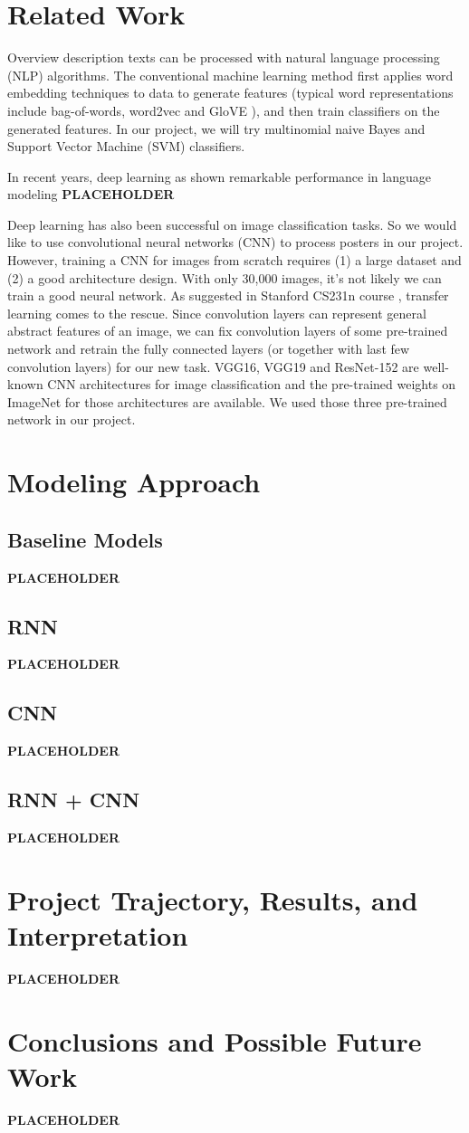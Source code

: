 \documentclass[12pt]{article} %
\newcommand{\plh}{\textbf{\color{red} PLACEHOLDER }}
\begin{document}
\section{Related Work}

Overview description texts can be processed with natural language processing (NLP) algorithms. The conventional machine learning method first applies word embedding techniques to data to generate features (typical word representations include bag-of-words, word2vec \cite{word2vec} and GloVE \cite{glove}), and then train classifiers on the generated features. In our project, we will try multinomial naive Bayes and Support Vector Machine (SVM) classifiers.

In recent years, deep learning as shown remarkable  performance in language modeling \plh

Deep learning has also been successful on image classification tasks. So we would like to use convolutional neural networks (CNN) to process posters in our project. However, training a CNN for images from scratch requires (1) a large dataset and (2) a good architecture design. With only 30,000 images, it's not likely we can train a good neural network. As suggested in Stanford CS231n course \cite{transferl}, transfer learning comes to the rescue. Since convolution layers can represent general abstract features of an image, we can fix convolution layers of some pre-trained network and retrain the fully connected layers (or together with last few convolution layers) for our new task. VGG16, VGG19 \cite{vgg} and ResNet-152 \cite{resnet} are well-known CNN architectures for image classification and the pre-trained weights on ImageNet for those architectures are available. We used those three pre-trained network in our project.


\section{Modeling Approach}

\subsection{Baseline Models}
\plh
\subsection{RNN}
\plh
\subsection{CNN}
\plh
\subsection{RNN + CNN}
\plh
\section{Project Trajectory, Results, and Interpretation}

\plh
\section{Conclusions and Possible Future Work}
\plh


\end{document}
